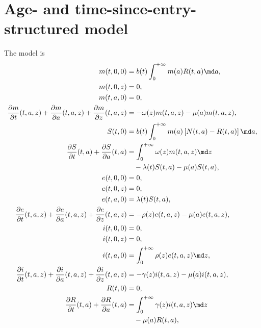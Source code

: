 \documentclass{jpmarticle}
\begin{document}
\section{Age- and time-since-entry-structured model}

The model is
\begin{equation}
  \label{model_age_and_time_since_entry_structured}
  \begin{split}
    m(t, 0, 0) &=
    b(t) \int_0^{+\infty} m(a) R(t, a) \md a,
    \\
    m(t, 0, z) &=
    0,
    \\
    m(t, a, 0) &=
    0,
    \\
    \frac{\partial m}{\partial t}(t, a, z)
    + \frac{\partial m}{\partial a}(t, a, z)
    + \frac{\partial m}{\partial z}(t, a, z) &=
    - \omega(z) m(t, a, z) - \mu(a) m(t, a, z),
    \\
    S(t, 0) &=
    b(t) \int_0^{+\infty} m(a) \left[N(t, a) - R(t, a)\right] \md a,
    \\
    \frac{\partial S}{\partial t}(t, a)
    + \frac{\partial S}{\partial a}(t, a)
    &=
    \int_0^{+\infty} \omega(z) m(t, a, z) \md z
    \\ & \quad {}
    - \lambda(t) S(t, a) - \mu(a) S(t, a),
    \\
    e(t, 0, 0) &=
    0,
    \\
    e(t, 0, z) &=
    0,
    \\
    e(t, a, 0) &=
    \lambda(t) S(t, a),
    \\
    \frac{\partial e}{\partial t}(t, a, z)
    + \frac{\partial e}{\partial a}(t, a, z)
    + \frac{\partial e}{\partial z}(t, a, z) &=
    - \rho(z) e(t, a, z) - \mu(a) e(t, a, z),
    \\
    i(t, 0, 0) &=
    0,
    \\
    i(t, 0, z) &=
    0,
    \\
    i(t, a, 0) &=
    \int_0^{+\infty} \rho(z) e(t, a, z) \md z,
    \\
    \frac{\partial i}{\partial t}(t, a, z)
    + \frac{\partial i}{\partial a}(t, a, z)
    + \frac{\partial i}{\partial z}(t, a, z) &=
    - \gamma(z) i(t, a, z) - \mu(a) i(t, a, z),
    \\
    R(t, 0) &=
    0,
    \\
    \frac{\partial R}{\partial t}(t, a)
    + \frac{\partial R}{\partial a}(t, a) &=
    \int_0^{+\infty} \gamma(z) i(t, a, z) \md z
    \\ & \quad {}
    - \mu(a) R(t, a),
  \end{split}
\end{equation}
\end{document}
